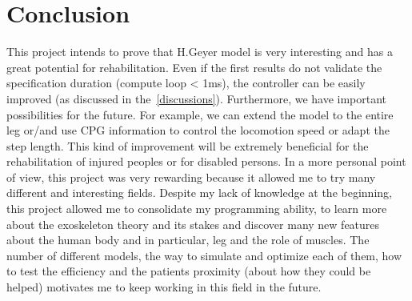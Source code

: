 \documentclass[a4paper,12pt]{article}
\begin{document}
\newpage
\section{Conclusion}

This project intends to prove that H.Geyer model is very interesting and has a great potential for rehabilitation. Even if the first results do not validate the specification duration (compute loop < 1ms), the controller can be easily improved (as discussed in the~\ref{discussions}). Furthermore, we have important possibilities for the future. For example, we can extend the model to the entire leg or/and use CPG information to control the locomotion speed or adapt the step length. This kind of improvement will be extremely beneficial for the rehabilitation of injured peoples or for disabled persons.
\medbreak
In a more personal point of view, this project was very rewarding because it allowed me to try many different and interesting fields. Despite my lack of knowledge at the beginning, this project allowed me to consolidate my programming ability, to learn more about the exoskeleton theory and its stakes and discover many new features about the human body and in particular, leg and the role of muscles.  
The number of different models, the way to simulate and optimize each of them, how to test the efficiency and the patients proximity (about how they could be helped) motivates me to keep working in this field in the future.

\newpage


\end{document}

